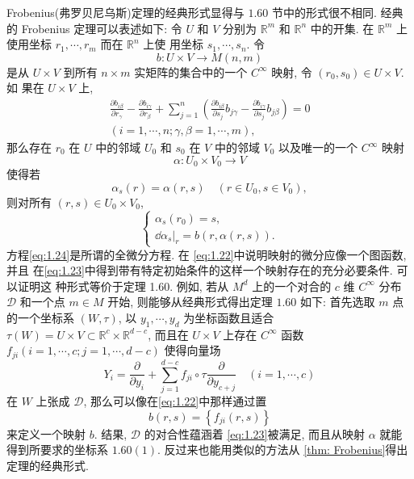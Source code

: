 \begin{remark}
 Frobenius(弗罗贝尼乌斯)定理的经典形式显得与 $1.60$ 节中的形式很不相同. 经典的 Frobenius 定理可以表述如下:
令 $U$ 和 $V$ 分别为 $\mathbb{R}^m$ 和 $\mathbb{R}^n$ 中的开集. 在 $\mathbb{R}^m$ 上使用坐标 $r_1, \cdots, r_m$ 而在 $\mathbb{R}^n$ 上使 用坐标 $s_1, \cdots, s_n$. 令
\begin{equation}
    \label{eq:1.22}
    b: U \times V \rightarrow M(n, m)
\end{equation}
是从 $U \times V$ 到所有 $n \times m$ 实矩阵的集合中的一个 $C^{\infty}$ 映射, 令 $\left(r_0, s_0\right) \in U \times V$. 如 果在 $U \times V$ 上,
\begin{equation}
    \label{eq:1.23}
    \begin{gathered}
\frac{\partial b_{i \beta}}{\partial r_\gamma}-\frac{\partial b_{i \gamma}}{\partial r_\beta}+\sum_{j=1}^n\left(\frac{\partial b_{i \beta}}{\partial s_j} b_{j \gamma}-\frac{\partial b_{i \gamma}}{\partial s_j} b_{j \beta}\right)=0 \\
(i=1, \cdots, n ; \gamma, \beta=1, \cdots, m),
\end{gathered}
\end{equation}
那么存在 $r_0$ 在 $U$ 中的邻域 $U_0$ 和 $s_0$ 在 $V$ 中的邻域 $V_0$ 以及唯一的一个 $C^{\infty}$ 映射
\begin{equation}
    \label{eq:1.24}
    \alpha: U_0 \times V_0 \rightarrow V
\end{equation}
使得若
\begin{equation*}
    \alpha_s (r) =\alpha (r,s)\quad (r\in U_0,s\in V_0),
\end{equation*}
则对所有 $(r,s)\in U_0\times V_0$,
\begin{equation}\label{eq:1.25}
    \begin{cases}
        \alpha_s (r_0)=s,\\ 
        \dd \alpha_s|_r=b(r,\alpha(r,s)).
    \end{cases}
\end{equation}
方程\eqref{eq:1.24}是所谓的全微分方程. 在 \eqref{eq:1.22}中说明映射的微分应像一个图函数, 并且 在\eqref{eq:1.23}中得到带有特定初始条件的这样一个映射存在的充分必要条件. 可以证明这 种形式等价于定理 1.60. 例如, 若从 $M^d$ 上的一个对合的 $c$ 维 $C^{\infty}$ 分布 $\mathscr{D}$ 和一个点 $m \in M$ 开始, 则能够从经典形式得出定理 $1.60$ 如下: 首先选取 $m$ 点的一个坐标系 $(W, \tau)$, 以 $y_1, \cdots, y_d$ 为坐标函数且适合 $\tau(W)=U \times V \subset \mathbb{R}^c \times \mathbb{R}^{d-c}$, 而且在 $U \times V$ 上存在 $C^{\infty}$ 函数 $f_{j i}(i=1, \cdots, c ; j=1, \cdots, d-c)$ 使得向量场
\begin{equation}
    \label{eq:1.26}
    Y_i=\frac{\partial}{\partial y_i}+\sum_{j=1}^{d-c} f_{j i} \circ \tau \frac{\partial}{\partial y_{c+j}} \quad(i=1, \cdots, c)
\end{equation}
在 $W$ 上张成 $\mathscr{D}$, 那么可以像在\eqref{eq:1.22}中那样通过置
\begin{equation}
    \label{eq:1.27}
    b(r, s)=\left\{f_{j i}(r, s)\right\}
\end{equation}
来定义一个映射 $b$. 结果, $\mathscr{D}$ 的对合性蕴涵着 \eqref{eq:1.23}被满足, 而且从映射 $\alpha$ 就能得到所要求的坐标系 $1.60(1)$. 反过来也能用类似的方法从 \ref{thm: Frobenius}得出定理的经典形式.



\end{remark}
